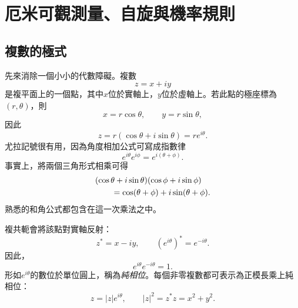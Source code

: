 \chapter{厄米可觀測量、自旋與機率規則}


\section{複數的極式}

先來消除一個小小的代數障礙。複數
\begin{equation}
  z=x+iy
\end{equation}
是複平面上的一個點，其中\(x\)位於實軸上，\(y\)位於虛軸上。若此點的極座標為\((r,\theta)\)，則
\begin{equation}
  x=r\cos\theta,
  \qquad
  y=r\sin\theta,
\end{equation}
因此
\begin{equation}
  z=r(\cos\theta+i\sin\theta)=re^{i\theta}.
  \label{eq:l03-polar-form}
\end{equation}
尤拉記號很有用，因為角度相加公式可寫成指數律
\begin{equation}
  e^{i\theta}e^{i\phi}
  =e^{i(\theta+\phi)}.
  \label{eq:l03-phase-product}
\end{equation}
事實上，將兩個三角形式相乘可得
\begin{align}
& (\cos\theta+i\sin\theta)(\cos\phi+i\sin\phi)
\notag\\
&\qquad=\cos(\theta+\phi)+i\sin(\theta+\phi).
\end{align}
熟悉的和角公式都包含在這一次乘法之中。

複共軛會將該點對實軸反射：
\begin{equation}
  z^*=x-iy,
  \qquad
  (e^{i\theta})^*=e^{-i\theta}.
\end{equation}
因此，
\begin{equation}
  e^{i\theta}e^{-i\theta}=1.
\end{equation}
形如\(e^{i\theta}\)的數位於單位圓上，稱為\emph{純相位}。每個非零複數都可表示為正模長乘上純相位：
\begin{equation}
  z=|z|e^{i\theta},
  \qquad
  |z|^2=z^*z=x^2+y^2.
  \label{eq:l03-modulus-phase}
\end{equation}

\begin{classroomqa}
\end{classroomqa}

